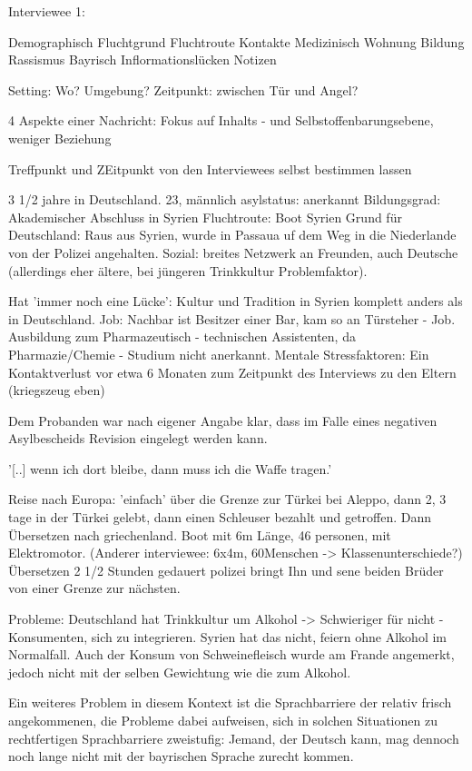 Interviewee 1:

Demographisch
Fluchtgrund
Fluchtroute
Kontakte
Medizinisch
Wohnung
Bildung
Rassismus
Bayrisch
Inflormationslücken
Notizen

Setting: Wo? Umgebung?
Zeitpunkt: zwischen Tür und Angel?

4 Aspekte einer Nachricht: Fokus auf Inhalts - und Selbstoffenbarungsebene, weniger Beziehung

Treffpunkt und ZEitpunkt von den Interviewees selbst bestimmen lassen


3 1/2 jahre in Deutschland.
23, männlich
asylstatus: anerkannt
Bildungsgrad: Akademischer Abschluss in Syrien
Fluchtroute: Boot
Syrien
Grund für Deutschland: Raus aus Syrien, wurde in Passaua uf dem Weg in die Niederlande von der Polizei angehalten.
Sozial: breites Netzwerk an Freunden, auch Deutsche (allerdings eher ältere, bei jüngeren Trinkkultur Problemfaktor).

Hat 'immer noch eine Lücke': Kultur und Tradition in Syrien komplett anders als in Deutschland.
Job: Nachbar ist Besitzer einer Bar, kam so an Türsteher - Job.
Ausbildung zum Pharmazeutisch - technischen Assistenten, da Pharmazie/Chemie - Studium nicht anerkannt.
Mentale Stressfaktoren:
Ein Kontaktverlust vor etwa 6 Monaten zum Zeitpunkt des Interviews zu den Eltern (kriegszeug eben)

Dem Probanden war nach eigener Angabe klar, dass im Falle eines negativen Asylbescheids Revision eingelegt werden kann.

'[..] wenn ich dort bleibe, dann muss ich die Waffe tragen.'

Reise nach Europa: 'einfach' über die Grenze zur Türkei bei Aleppo, dann 2, 3 tage in der Türkei gelebt, dann einen Schleuser bezahlt und getroffen. Dann Übersetzen nach griechenland. Boot mit 6m Länge, 46 personen, mit Elektromotor. (Anderer interviewee: 6x4m, 60Menschen -> Klassenunterschiede?)
Übersetzen 2 1/2 Stunden gedauert
polizei bringt Ihn und sene beiden Brüder von einer Grenze zur nächsten. 


Probleme: 
    Deutschland hat Trinkkultur um Alkohol -> Schwieriger für nicht - Konsumenten, sich zu integrieren. Syrien hat das nicht, feiern ohne Alkohol im Normalfall.
    Auch der Konsum von Schweinefleisch wurde am Frande angemerkt, jedoch nicht mit der selben Gewichtung wie die zum Alkohol.
    
    Ein weiteres Problem in diesem Kontext ist die Sprachbarriere der relativ frisch angekommenen, die Probleme dabei aufweisen, sich in solchen Situationen zu rechtfertigen
    Sprachbarriere zweistufig: Jemand, der Deutsch kann, mag dennoch noch lange nicht mit der bayrischen Sprache zurecht kommen.
    
